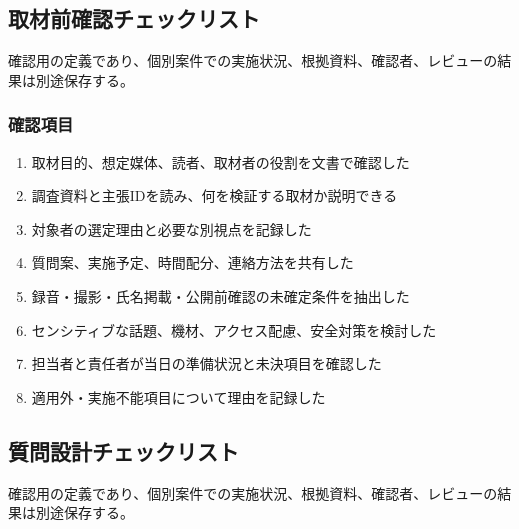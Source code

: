 \documentclass[a4paper,11pt]{article}
\begin{document}
\subsection{取材前確認チェックリスト}
\par 確認用の定義であり、個別案件での実施状況、根拠資料、確認者、レビューの結果は別途保存する。\par\medskip
\subsubsection*{確認項目}
\begin{enumerate}[leftmargin=2em,itemsep=0.3em]
\item 取材目的、想定媒体、読者、取材者の役割を文書で確認した\par
\item 調査資料と主張IDを読み、何を検証する取材か説明できる\par
\item 対象者の選定理由と必要な別視点を記録した\par
\item 質問案、実施予定、時間配分、連絡方法を共有した\par
\item 録音・撮影・氏名掲載・公開前確認の未確定条件を抽出した\par
\item センシティブな話題、機材、アクセス配慮、安全対策を検討した\par
\item 担当者と責任者が当日の準備状況と未決項目を確認した\par
\item 適用外・実施不能項目について理由を記録した\par
\end{enumerate}
\subsection{質問設計チェックリスト}
\par 確認用の定義であり、個別案件での実施状況、根拠資料、確認者、レビューの結果は別途保存する。\par\medskip
\end{document}
